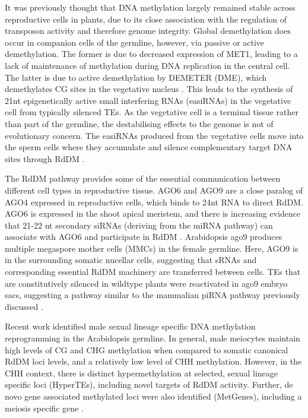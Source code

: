 It was previously thought that DNA methylation largely remained stable across reproductive cells in plants, due to its close association with the regulation of transposon activity \citep{RN247} and therefore genome integrity. Global demethylation does occur in companion cells of the germline, however, via passive or active demethylation. The former is due to decreased expression of MET1, leading to a lack of maintenance of methylation during DNA replication in the central cell. The latter is due to active demethylation by DEMETER (DME), which demethylates CG sites in the vegetative nucleus \citep{RN235,RN57}. This leads to the synthesis of 21nt epigenetically active small interfering RNAs (easiRNAs) in the vegetative cell from typically silenced TEs. As the vegetative cell is a terminal tissue rather than part of the germline, the destabilising effects to the genome is not of evolutionary concern. The easiRNAs produced from the vegetative cells move into the sperm cells where they accumulate and silence complementary target DNA sites through RdDM \citep{RN14,RN16}.

The RdDM pathway provides some of the essential communication between different cell types in reproductive tissue. AGO6 and AGO9 are a close paralog of AGO4 expressed in reproductive cells, which binds to 24nt RNA to direct RdDM. AGO6 is expressed in the shoot apical meristem, and there is increasing evidence that 21-22 nt secondary siRNAs (deriving from the miRNA pathway) can associate with AGO6 and participate in RdDM \citep{RN133,RN61,RN33}. Arabidopsis ago9 produces multiple megaspore mother cells (MMCs) in the female germline. Here, AGO9 is in the surrounding somatic nucellar cells, suggesting that sRNAs and corresponding essential RdDM machinery are transferred between cells.  TEs that are constitutively silenced in wildtype plants were reactivated in ago9 embryo sacs, suggesting a pathway similar to the mammalian piRNA pathway previously discussed \citep{RN14}.

Recent work identified male sexual lineage specific DNA methylation reprogramming in the Arabidopsis germline. In general, male meiocytes maintain high levels of CG and CHG methylation when compared to somatic canonical RdDM loci levels, and a relatively low level of CHH methylation. However, in the CHH context, there is distinct hypermethylation at selected, sexual lineage specific loci (HyperTEs), including novel targets of RdDM activity. Further, de novo gene associated methylated loci were also identified (MetGenes), including a meiosis specific gene \citep{RN199}.

